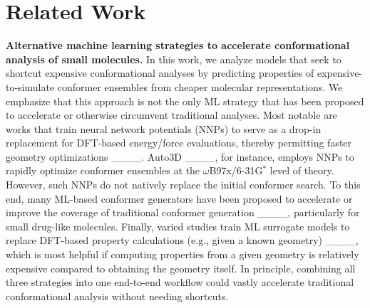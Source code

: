 \section{Related Work}
\label{relatedwork}

\textbf{Alternative machine learning strategies to accelerate conformational analysis of small molecules.}
In this work, we analyze models that seek to shortcut expensive conformational analyses by predicting properties of expensive-to-simulate conformer ensembles from cheaper molecular representations. We emphasize that this approach is not the only ML strategy that has been proposed to accelerate or otherwise circumvent traditional analyses. Most notable are works that train neural network potentials (NNPs) to serve as a drop-in replacement for DFT-based energy/force evaluations, thereby permitting faster geometry optimizations ____. Auto3D ____, for instance, employs NNPs to rapidly optimize conformer ensembles at the $\omega$B97x/6-31G$^*$ level of theory. However, such NNPs do not natively replace the initial conformer search. To this end, many ML-based conformer generators have been proposed to accelerate or improve the coverage of traditional conformer generation ____, particularly for small drug-like molecules. Finally, varied studies train ML surrogate models to replace DFT-based property calculations (e.g., given a known geometry) ____, which is most helpful if computing properties from a given geometry is relatively expensive compared to obtaining the geometry itself. In principle, combining all three strategies into one end-to-end workflow could vastly accelerate traditional conformational analysis without needing shortcuts.

